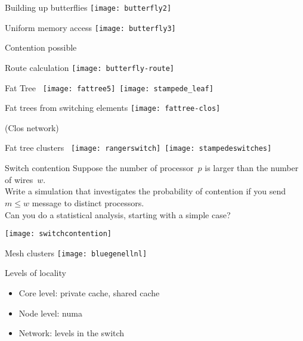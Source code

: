 \begin{numberedframe}{Building up butterflies}
      \texttt{[image: butterfly2]}
\end{numberedframe}

\begin{numberedframe}{Uniform memory access}
  \texttt{[image: butterfly3]}
  
  Contention possible
\end{numberedframe}

\begin{numberedframe}{Route calculation}
  \texttt{[image: butterfly-route]}
\end{numberedframe}

\begin{numberedframe}{Fat Tree}
\hbox{%
  \texttt{[image: fattree5]}
  \kern20pt
  \texttt{[image: stampede\_leaf]}
}
\end{numberedframe}

\begin{numberedframe}{Fat trees from switching elements}
    \texttt{[image: fattree-clos]}

(Clos network)
\end{numberedframe}

\begin{numberedframe}{Fat tree clusters}
  \hbox{%
    \texttt{[image: rangerswitch]}\kern1cm
    \texttt{[image: stampedeswitches]}%
  }
\end{numberedframe}

\begin{exercise}{Switch contention}
  Suppose the number of processor~$p$ is larger than the number of wires~$w$.\\
  Write a simulation that investigates the probability of contention if you
  send $m\leq w$ message to distinct processors.\\
  Can you do a statistical analysis, starting with a simple case?

  \texttt{[image: switchcontention]}
\end{exercise}

\begin{numberedframe}{Mesh clusters}
  \texttt{[image: bluegenellnl]}
\end{numberedframe}
 
\begin{numberedframe}{Levels of locality}
  \begin{itemize}
  \item Core level: private cache, shared cache
  \item Node level: numa
  \item Network: levels in the switch
  \end{itemize}
\end{numberedframe}

